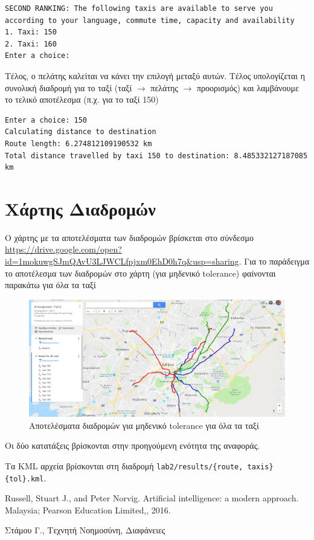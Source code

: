 \documentclass[a4paper,12pt]{article}
\begin{document}
\begin{lstlisting}
SECOND RANKING: The following taxis are available to serve you according to your language, commute time, capacity and availability
1. Taxi: 150
2. Taxi: 160
Enter a choice: 
\end{lstlisting} 

Τέλος, ο πελάτης καλείται να κάνει την επιλογή μεταξύ αυτών. Τέλος υπολογίζεται η συνολική διαδρομή για το ταξί (ταξί $\to$ πελάτης $\to$ προορισμός) και λαμβάνουμε το τελικό αποτέλεσμα (π.χ. για το ταξί 150)

\begin{lstlisting}
Enter a choice: 150
Calculating distance to destination
Route length: 6.274812109190532 km
Total distance travelled by taxi 150 to destination: 8.485332127187085 km
\end{lstlisting}


\section{Χάρτης Διαδρομών}

Ο χάρτης με τα αποτελέσματα των διαδρομών βρίσκεται στο σύνδεσμο \url{https://drive.google.com/open?id=1mokuwgSJmQAvU3LJWCLfpjxm0EhD0h7q&usp=sharing}. Για το παράδειγμα το αποτέλεσμα των διαδρομών στο χάρτη (για μηδενικό tolerance) φαίνονται παρακάτω για όλα τα ταξί

\begin{figure}[H]
\centering
\includegraphics[scale=0.25]{example.png}
\caption{Αποτελέσματα διαδρομών για μηδενικό tolerance για όλα τα ταξί}
\label{}
\end{figure}

Οι δύο κατατάξεις βρίσκονται στην προηγούμενη ενότητα της αναφοράς.

Τα KML αρχεία βρίσκονται στη διαδρομή \texttt{lab2/results/\{route, taxis\}\{tol\}.kml}.




\begin{thebibliography}{9}

 Russell, Stuart J., and Peter Norvig. Artificial intelligence: a modern approach. Malaysia; Pearson Education Limited,, 2016.

 Στάμου Γ., Τεχνητή Νοημοσύνη, Διαφάνειες

\end{thebibliography}
\end{document}
